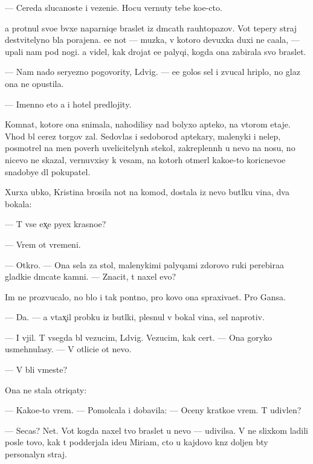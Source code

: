 \documentclass[10pt]{book}
\begin{document}
— Cereda sluca{\y}noste{\y} i vezeni{\y}e. Hocu vernuty tebe ko{\y}e-cto.

{\Y}a prot{\ia}nul svo{\y}e{\y} b{\yi}vxe{\y} naparniqe braslet iz d{\yi}mcat{\yi}h rauhtopazov. Vot tepery straj de{\y}stvitelyno b{\yi}la porajena. {\Y}ee not{\yi} — muz{\yi}ka, v kotoro{\y} devuxka duxi ne ca{\y}ala, — upali nam pod nogi. {\Y}a videl, kak drojat {\y}e{\y}e palyqi, kogda ona zabirala svo{\y} braslet.

— Nam nado seryezno pogovority, L{\iu}dvig. — {\Y}ee golos sel i zvucal hriplo, no glaz ona ne opustila.

— Imenno eto {\y}a i hotel predlojity.



Komnat{\yi}, kotor{\yi}{\y}e ona snimala, nahodilisy nad bolyxo{\y} apteko{\y}, na vtorom etaje. Vhod b{\yi}l cerez torgov{\yi}{\y} zal. Sedovlas{\yi}{\y} i sedoborod{\yi}{\y} aptekary, malenyki{\y} i nelep{\yi}{\y}, posmotrel na men{\ia} poverh uvelicitelyn{\yi}h stekol, zakreplenn{\yi}h u nevo na nosu, no nicevo ne skazal, vernuvxisy k vesam, na kotor{\yi}h otmer{\ia}l kako{\y}e-to koricnevo{\y}e snadobye dl{\ia} pokupatel{\ia}.

Xurxa {\y}ubko{\y}, Kristina brosila not{\yi} na komod, dostala iz nevo but{\yi}lku vina, dva bokala:

— T{\yi} vse {\y}ex̨e pyex krasno{\y}e?

— Vrem{\ia} ot vremeni.

— Otkro{\y}. — Ona sela za stol, malenykimi palyqami zdorovo{\y} ruki perebira{\y}a gladki{\y}e d{\yi}mcat{\yi}{\y}e kamni. — Znacit, t{\yi} naxel {\y}evo?

Im{\ia} ne prozvucalo, no b{\yi}lo i tak pon{\ia}tno, pro kovo ona spraxiva{\y}et. Pro Gansa.

— Da. — {\Y}a v{\yi}tax̨il probku iz but{\yi}lki, plesnul v bokal{\yi} vina, sel naprotiv.

— I v{\yi}jil. T{\yi} vsegda b{\yi}l vezucim, L{\iu}dvig. Vezucim, kak cert. — Ona goryko usmehnulasy. — V otlici{\y}e ot nevo.

— V{\yi} b{\yi}li vmeste?

Ona ne stala otriqaty:

— Kako{\y}e-to vrem{\ia}. — Pomolcala i dobavila: — Oceny kratko{\y}e vrem{\ia}. T{\yi} udivlen?

— Se{\y}cas? Net. Vot kogda naxel tvo{\y} braslet u nevo — udivilsa. V{\yi} ne slixkom ladili posle tovo, kak t{\yi} podderjala ide{\y}u Miriam, cto u kajdovo kn{\ia}z{\ia} doljen b{\yi}ty personalyn{\yi}{\y} straj.
\end{document}

